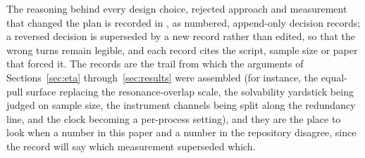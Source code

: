 The reasoning behind every design choice, rejected approach and measurement
that changed the plan is recorded in , as numbered,
append-only decision records; a reversed decision is superseded by a new
record rather than edited, so that the wrong turns remain legible, and each
record cites the script, sample size or paper that forced it. The records are
the trail from which the arguments of Sections~\ref{sec:eta}
through~\ref{sec:results} were assembled (for instance, the equal-pull surface
replacing the resonance-overlap scale, the solvability yardstick being judged
on sample size, the instrument channels being split along the redundancy
line, and the clock becoming a per-process setting), and they are the place
to look when a number in this paper and a number in the repository disagree,
since the record will say which measurement superseded which.
